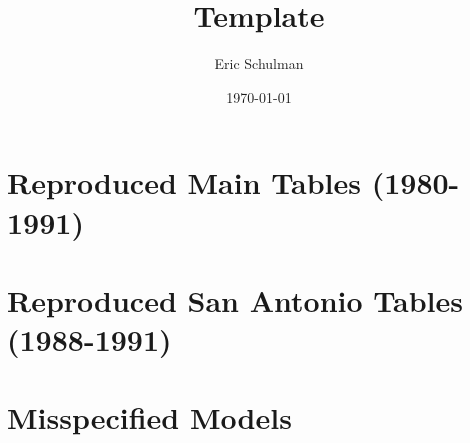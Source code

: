 \documentclass{article}
\title{Template}
\author{Eric Schulman}
\date{\today}
\begin{document}
\section{Reproduced Main Tables (1980-1991)}





\pagebreak

\section{Reproduced San Antonio Tables (1988-1991)}





\pagebreak

\section{Misspecified Models}





\end{document}
